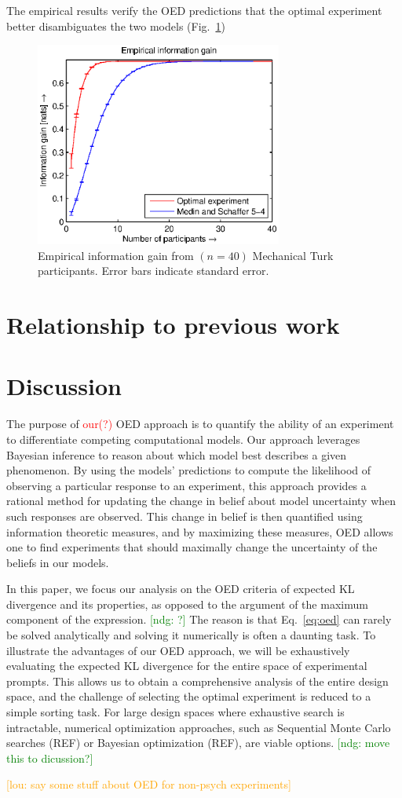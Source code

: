 \documentclass{article}
\newcommand{\red}[1]{\textcolor{Red}{#1}}
\newcommand{\ndg}[1]{\textcolor{Green}{[ndg: #1]}}
\newcommand{\lou}[1]{\textcolor{orange}{[lou: #1]}}
\begin{document}
The empirical results verify the OED predictions that the optimal experiment better disambiguates the two models (Fig.~\ref{fig:empirical})
\begin{figure}[h!]
\centering
\includegraphics[width=3.2in]{img/empirical.eps}
\caption{Empirical information gain from $(n=40)$ Mechanical Turk participants. Error bars indicate standard error.}
\label{fig:empirical}
\end{figure}


\section{Relationship to previous work}
\section{Discussion}

The purpose of \red{our(?)} OED approach is to quantify the ability of an experiment to differentiate competing computational models. Our approach leverages Bayesian inference to reason about which model best describes a given phenomenon. By using the models' predictions to compute the likelihood of observing a particular response to an experiment, this approach provides a rational method for updating the change in belief about model uncertainty when such responses are observed. This change in belief is then quantified using information theoretic measures, and by maximizing these measures, OED allows one to find experiments that should maximally change the uncertainty of the beliefs in our models.


In this paper, we focus our analysis on the OED criteria of expected KL divergence and its properties, as opposed to the argument of the maximum component of the expression. \ndg{?} The reason is that Eq.~\ref{eq:oed} can rarely be solved analytically and solving it numerically is often a daunting task. To illustrate the advantages of our OED approach, we will be exhaustively evaluating the expected KL divergence for the entire  space of experimental prompts. This allows us to obtain a comprehensive analysis of the entire design space, and the challenge of selecting the optimal experiment is reduced to a simple sorting task. For large design spaces where exhaustive search is intractable, numerical optimization approaches, such as Sequential Monte Carlo searches (REF) or Bayesian optimization (REF), are viable options.  \ndg{move this to dicussion?}



\lou{say some stuff about OED for non-psych experiments}

%
%
\end{document}
